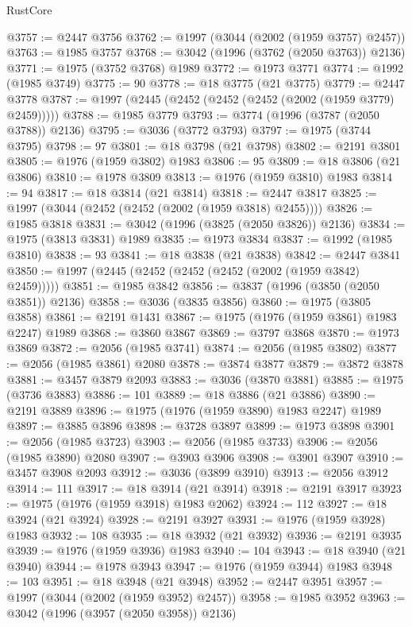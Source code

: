\begin{lexlean}{RustCore}
\begin{coremodule}
@3757 := @2447 @3756
@3762 := @1997 (@3044 (@2002 (@1959 @3757) @2457))
@3763 := @1985 @3757
@3768 := @3042 (@1996 (@3762 (@2050 @3763)) @2136)
@3771 := @1975 (@3752 @3768) @1989
@3772 := @1973 @3771
@3774 := @1992 (@1985 @3749)
@3775 := 90
@3778 := @18 @3775 (@21 @3775)
@3779 := @2447 @3778
@3787 := @1997 (@2445 (@2452 (@2452 (@2452 (@2002 (@1959 @3779) @2459)))))
@3788 := @1985 @3779
@3793 := @3774 (@1996 (@3787 (@2050 @3788)) @2136)
@3795 := @3036 (@3772 @3793)
@3797 := @1975 (@3744 @3795)
@3798 := 97
@3801 := @18 @3798 (@21 @3798)
@3802 := @2191 @3801
@3805 := @1976 (@1959 @3802) @1983
@3806 := 95
@3809 := @18 @3806 (@21 @3806)
@3810 := @1978 @3809
@3813 := @1976 (@1959 @3810) @1983
@3814 := 94
@3817 := @18 @3814 (@21 @3814)
@3818 := @2447 @3817
@3825 := @1997 (@3044 (@2452 (@2452 (@2002 (@1959 @3818) @2455))))
@3826 := @1985 @3818
@3831 := @3042 (@1996 (@3825 (@2050 @3826)) @2136)
@3834 := @1975 (@3813 @3831) @1989
@3835 := @1973 @3834
@3837 := @1992 (@1985 @3810)
@3838 := 93
@3841 := @18 @3838 (@21 @3838)
@3842 := @2447 @3841
@3850 := @1997 (@2445 (@2452 (@2452 (@2452 (@2002 (@1959 @3842) @2459)))))
@3851 := @1985 @3842
@3856 := @3837 (@1996 (@3850 (@2050 @3851)) @2136)
@3858 := @3036 (@3835 @3856)
@3860 := @1975 (@3805 @3858)
@3861 := @2191 @1431
@3867 := @1975 (@1976 (@1959 @3861) @1983 @2247) @1989
@3868 := @3860 @3867
@3869 := @3797 @3868
@3870 := @1973 @3869
@3872 := @2056 (@1985 @3741)
@3874 := @2056 (@1985 @3802)
@3877 := @2056 (@1985 @3861) @2080
@3878 := @3874 @3877
@3879 := @3872 @3878
@3881 := @3457 @3879 @2093
@3883 := @3036 (@3870 @3881)
@3885 := @1975 (@3736 @3883)
@3886 := 101
@3889 := @18 @3886 (@21 @3886)
@3890 := @2191 @3889
@3896 := @1975 (@1976 (@1959 @3890) @1983 @2247) @1989
@3897 := @3885 @3896
@3898 := @3728 @3897
@3899 := @1973 @3898
@3901 := @2056 (@1985 @3723)
@3903 := @2056 (@1985 @3733)
@3906 := @2056 (@1985 @3890) @2080
@3907 := @3903 @3906
@3908 := @3901 @3907
@3910 := @3457 @3908 @2093
@3912 := @3036 (@3899 @3910)
@3913 := @2056 @3912
@3914 := 111
@3917 := @18 @3914 (@21 @3914)
@3918 := @2191 @3917
@3923 := @1975 (@1976 (@1959 @3918) @1983 @2062)
@3924 := 112
@3927 := @18 @3924 (@21 @3924)
@3928 := @2191 @3927
@3931 := @1976 (@1959 @3928) @1983
@3932 := 108
@3935 := @18 @3932 (@21 @3932)
@3936 := @2191 @3935
@3939 := @1976 (@1959 @3936) @1983
@3940 := 104
@3943 := @18 @3940 (@21 @3940)
@3944 := @1978 @3943
@3947 := @1976 (@1959 @3944) @1983
@3948 := 103
@3951 := @18 @3948 (@21 @3948)
@3952 := @2447 @3951
@3957 := @1997 (@3044 (@2002 (@1959 @3952) @2457))
@3958 := @1985 @3952
@3963 := @3042 (@1996 (@3957 (@2050 @3958)) @2136)

\end{coremodule}
\end{lexlean}
